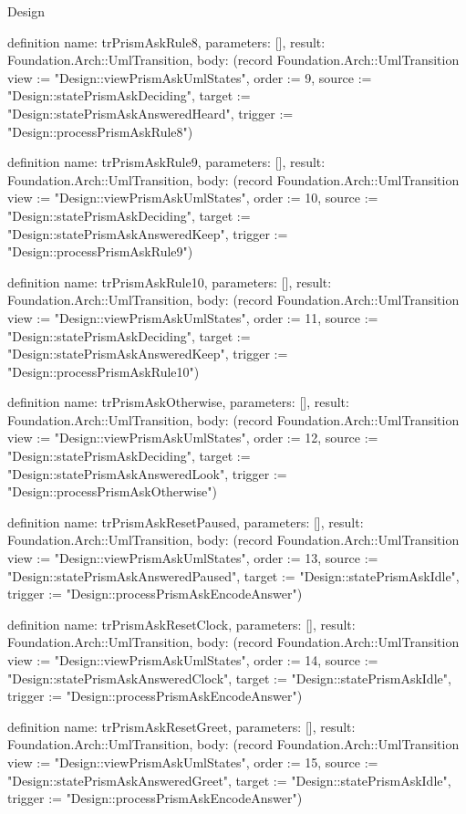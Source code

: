 \begin{lexlean}{Design}
\begin{semanticmodule}
definition{
  name: trPrismAskRule8,
  parameters: [],
  result: Foundation.Arch::UmlTransition,
  body: (record Foundation.Arch::UmlTransition {view := "Design::viewPrismAskUmlStates", order := 9, source := "Design::statePrismAskDeciding", target := "Design::statePrismAskAnsweredHeard", trigger := "Design::processPrismAskRule8"})
}

definition{
  name: trPrismAskRule9,
  parameters: [],
  result: Foundation.Arch::UmlTransition,
  body: (record Foundation.Arch::UmlTransition {view := "Design::viewPrismAskUmlStates", order := 10, source := "Design::statePrismAskDeciding", target := "Design::statePrismAskAnsweredKeep", trigger := "Design::processPrismAskRule9"})
}

definition{
  name: trPrismAskRule10,
  parameters: [],
  result: Foundation.Arch::UmlTransition,
  body: (record Foundation.Arch::UmlTransition {view := "Design::viewPrismAskUmlStates", order := 11, source := "Design::statePrismAskDeciding", target := "Design::statePrismAskAnsweredKeep", trigger := "Design::processPrismAskRule10"})
}

definition{
  name: trPrismAskOtherwise,
  parameters: [],
  result: Foundation.Arch::UmlTransition,
  body: (record Foundation.Arch::UmlTransition {view := "Design::viewPrismAskUmlStates", order := 12, source := "Design::statePrismAskDeciding", target := "Design::statePrismAskAnsweredLook", trigger := "Design::processPrismAskOtherwise"})
}

definition{
  name: trPrismAskResetPaused,
  parameters: [],
  result: Foundation.Arch::UmlTransition,
  body: (record Foundation.Arch::UmlTransition {view := "Design::viewPrismAskUmlStates", order := 13, source := "Design::statePrismAskAnsweredPaused", target := "Design::statePrismAskIdle", trigger := "Design::processPrismAskEncodeAnswer"})
}

definition{
  name: trPrismAskResetClock,
  parameters: [],
  result: Foundation.Arch::UmlTransition,
  body: (record Foundation.Arch::UmlTransition {view := "Design::viewPrismAskUmlStates", order := 14, source := "Design::statePrismAskAnsweredClock", target := "Design::statePrismAskIdle", trigger := "Design::processPrismAskEncodeAnswer"})
}

definition{
  name: trPrismAskResetGreet,
  parameters: [],
  result: Foundation.Arch::UmlTransition,
  body: (record Foundation.Arch::UmlTransition {view := "Design::viewPrismAskUmlStates", order := 15, source := "Design::statePrismAskAnsweredGreet", target := "Design::statePrismAskIdle", trigger := "Design::processPrismAskEncodeAnswer"})
}


\end{semanticmodule}
\end{lexlean}
